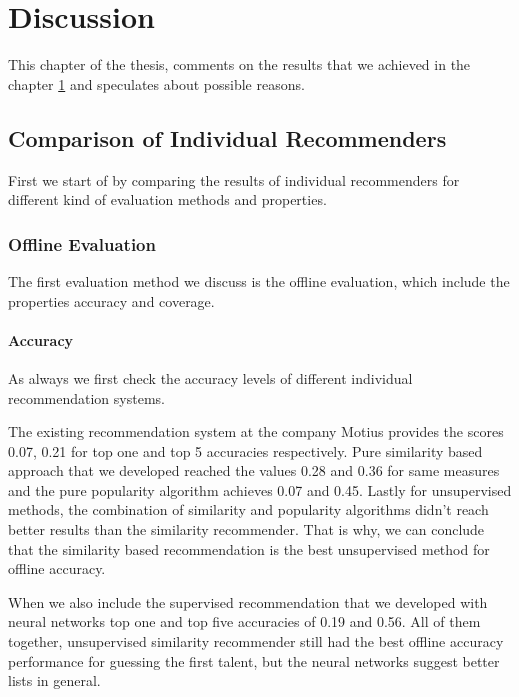 
\chapter{Discussion}\label{chapter:discussion}

This chapter of the thesis, comments on the results that we achieved in the chapter \ref{chapter:discussion} and speculates about possible reasons.

\section{Comparison of Individual Recommenders}

First we start of by comparing the results of individual recommenders for different kind of evaluation methods and properties.

\subsection{Offline Evaluation}

The first evaluation method we discuss is the offline evaluation, which include the properties accuracy and coverage.

\subsubsection{Accuracy}\label{discussion:single-offline-accuracy}

As always we first check the accuracy levels of different individual recommendation systems.

The existing recommendation system at the company Motius provides the scores 0.07, 0.21 for top one and top 5 accuracies respectively. Pure similarity based approach that we developed reached the values 0.28 and 0.36 for same measures and the pure popularity algorithm achieves 0.07 and 0.45. Lastly for unsupervised methods, the combination of similarity and popularity algorithms didn't reach better results than the similarity recommender. That is why, we can conclude that the similarity based recommendation is the best unsupervised method for offline accuracy.

When we also include the supervised recommendation that we developed with neural networks top one and top five accuracies of 0.19 and 0.56. All of them together, unsupervised similarity recommender still had the best offline accuracy performance for guessing the first talent, but the neural networks suggest better lists in general.

